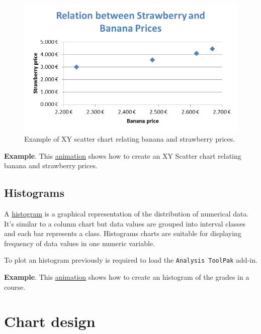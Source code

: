 \begin{figure}[htbp]
\begin{center}
\includegraphics[scale=0.7]{../img/example_chart_scatter.png}
\end{center}
\caption{Example of XY scatter chart relating banana and strawberry prices.}
\label{img-example_chart_scatter}
\end{figure}

\textbf{Example}. This \href{http://aprendeconalf.es/office/excel/manual/img/example_chart_scatter.gif}{animation} shows how to create an XY Scatter chart relating banana and strawberry prices.

\subsection{Histograms}\hypertarget{histograms}{}\label{histograms}

A \href{https://en.wikipedia.org/wiki/Histogram}{histogram} is a graphical representation of the distribution of numerical data. It's similar to a column chart but data values are grouped into interval classes and each bar represents a class. Histograms charts are suitable for displaying frequency of data values in one numeric variable.

To plot an histogram previously is required to load the \texttt{Analysis ToolPak} add-in.

\textbf{Example}. This \href{http://aprendeconalf.es/office/excel/manual/img/example_chart_histogram.gif}{animation} shows how to create an histogram of the grades in a course.

\section{Chart design}\hypertarget{chart-design}{}\label{chart-design}

